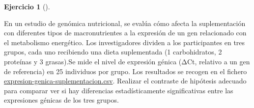 \documentclass[
  spanish,
  a4paper,
]{scrreport}
\theoremstyle{definition}
\newtheorem{exercise}{Ejercicio}[chapter]
\theoremstyle{remark}
\begin{document}
\begin{exercise}[]\protect\hypertarget{exr-contraste-anova-suplementacion}{}\label{exr-contraste-anova-suplementacion}

En un estudio de genómica nutricional, se evalúa cómo afecta la
suplementación con diferentes tipos de macronutrientes a la expresión de
un gen relacionado con el metabolismo energético. Los investigadores
dividen a los participantes en tres grupos, cada uno recibiendo una
dieta suplementada (1 carbohidratos, 2 proteínas y 3 grasas).Se mide el
nivel de expresión génica (ΔCt, relativo a un gen de referencia) en 25
individuos por grupo. Los resultados se recogen en el fichero
\href{datos/expresion-genica-suplementacion.csv}{expresion-genica-suplementacion.csv}.
Realizar el contraste de hipótesis adecuado para comparar ver si hay
diferencias estadísticamente significativas entre las expresiones
génicas de los tres grupos.

\end{exercise}
\end{document}
